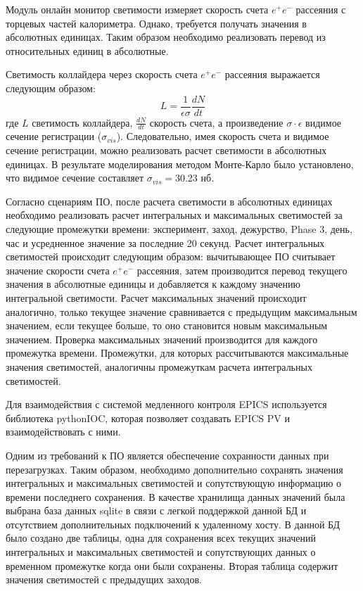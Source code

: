   Модуль онлайн монитор светимости измеряет скорость счета $e^+e^-$ рассеяния с торцевых частей калориметра. Однако, требуется получать значения в абсолютных единицах. Таким образом необходимо реализовать перевод из относительных единиц в абсолютные.\par
 Светимость коллайдера через скорость счета $e^+e^-$ рассеяния выражается следующим образом:
\begin{equation}
  L = \frac{1}{\epsilon\sigma}\frac{dN}{dt} 
\end{equation}
где $L$ светимость коллайдера, $\frac{dN}{dt}$ скорость счета, а произведение $\sigma\cdot\epsilon$ видимое сечение регистрации ($\sigma_{vis}$). Следовательно, имея скорость счета и видимое сечение регистрации, можно реализовать расчет светимости в абсолютных единицах. В результате моделирования методом Монте-Карло было установлено, что видимое сечение составляет $\sigma_{vis}=$30.23 нб.\par
  Согласно сценариям ПО, после расчета светимости в абсолютных единицах необходимо реализовать расчет интегральных и максимальных светимостей за следующие промежутки времени: эксперимент, заход, дежурство, Phase 3, день, час и усредненное значение за последние 20 секунд.
 Расчет интегральных светимостей происходит следующим образом: вычитывающее ПО считывает значение скорости счета $e^+e^-$ рассеяния, затем производится перевод текущего значения в абсолютные единицы и добавляется к каждому значению интегральной светимости. Расчет максимальных значений происходит аналогично, только текущее значение сравнивается с предыдущим максимальным значением, если текущее больше, то оно становится новым максимальным значением. Проверка максимальных значений производится для каждого промежутка времени. Промежутки, для которых рассчитываются максимальные значения светимостей, аналогичны промежуткам расчета интегральных светимостей.\par
  Для взаимодействия с системой медленного контроля EPICS используется библиотека pythonIOC, которая позволяет создавать EPICS PV и взаимодействовать с ними.\par
  Одним из требований к ПО является обеспечение сохранности данных при перезагрузках. Таким образом, необходимо дополнительно сохранять значения интегральных и максимальных светимостей и сопутствующую информацию о времени последнего сохранения. В качестве хранилища данных значений была выбрана база данных sqlite в связи с легкой поддержкой данной БД и отсутствием дополнительных подключений к удаленному хосту. В данной БД было создано две таблицы, одна для сохранения всех текущих значений интегральных и максимальных светимостей и сопутствующих данных о временном промежутке когда они были сохранены. Вторая таблица содержит значения светимостей с предыдущих заходов.
